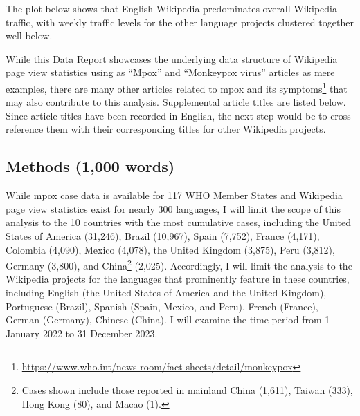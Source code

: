 \documentclass[
  12pt,
]{article}
\begin{document}
The plot below shows that English Wikipedia predominates overall
Wikipedia traffic, with weekly traffic levels for the other language
projects clustered together well below.

While this Data Report showcases the underlying data structure of
Wikipedia page view statistics using as ``Mpox'' and ``Monkeypox virus''
articles as mere examples, there are many other articles related to mpox
and its symptoms\footnote{\url{https://www.who.int/news-room/fact-sheets/detail/monkeypox}}
that may also contribute to this analysis. Supplemental article titles
are listed below. Since article titles have been recorded in English,
the next step would be to cross-reference them with their corresponding
titles for other Wikipedia projects.

\subsection{Methods (1,000 words)}\label{methods-1000-words}

While mpox case data is available for 117 WHO Member States and
Wikipedia page view statistics exist for nearly 300 languages, I will
limit the scope of this analysis to the 10 countries with the most
cumulative cases, including the United States of America (31,246),
Brazil (10,967), Spain (7,752), France (4,171), Colombia (4,090), Mexico
(4,078), the United Kingdom (3,875), Peru (3,812), Germany (3,800), and
China\footnote{Cases shown include those reported in mainland China
  (1,611), Taiwan (333), Hong Kong (80), and Macao (1).} (2,025).
Accordingly, I will limit the analysis to the Wikipedia projects for the
languages that prominently feature in these countries, including English
(the United States of America and the United Kingdom), Portuguese
(Brazil), Spanish (Spain, Mexico, and Peru), French (France), German
(Germany), Chinese (China). I will examine the time period from 1
January 2022 to 31 December 2023.
\end{document}
